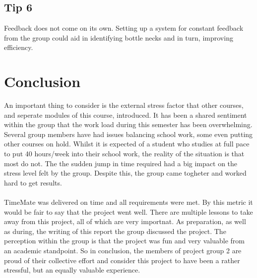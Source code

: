 \documentclass{article}
\begin{document}
    \subsection{Tip 6}
        Feedback does not come on its own. Setting up a system for constant feedback from the group could aid in identifying bottle necks and in turn, improving efficiency.
    
\section{Conclusion \label{conclusion}}
    An important thing to consider is the external stress factor that other courses, and seperate 
    modules of this course, introduced. It has been a shared sentiment within the group that the 
    work load during this semester has been overwhelming. Several group members have had issues 
    balancing school work, some even putting other courses on hold. Whilst it is expected of a 
    student who studies at full pace to put 40 hours/week into their school work, the reality 
    of the situation is that most do not. The the sudden jump in time required had a big impact 
    on the stress level felt by the group. Despite this, the group came togheter and worked hard to get results. 
    \\ \\
    TimeMate was delivered on time and all requirements were met. By this metric it would be
    fair to say that the project went well. There are multiple lessons to take away from this project, all of which are very importnat.
    As preparation, as well as during, the writing of this report the group discussed the project. The perception within the group is
    that the project was fun and very valuable from an academic standpoint. So in conclusion, the members of project group 2 are proud of
    their collective effort and consider this project to have been a rather stressful, but an equally valuable experience.
    
\newpage
\end{document}
